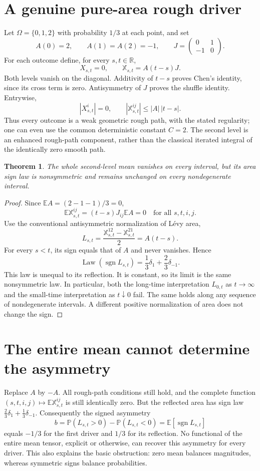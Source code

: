 \documentclass[11pt]{article}
\newtheorem{theorem}{Theorem}
\newcommand{\E}{\mathbb E}
\newcommand{\Prob}{\mathbb P}
\begin{document}
\section*{A genuine pure-area rough driver}
Let $\Omega=\{0,1,2\}$ with probability $1/3$ at each point, and set
\[
A(0)=2,\qquad A(1)=A(2)=-1,
\qquad J=\begin{pmatrix}0&1\\-1&0\end{pmatrix}.
\]
For each outcome define, for every $s,t\in\mathbb R$,
\[
X_{s,t}=0,\qquad \mathbb X_{s,t}=A(t-s)J.
\]
Both levels vanish on the diagonal. Additivity of $t-s$ proves Chen's
identity, since its cross term is zero. Antisymmetry of $J$ proves the shuffle
identity. Entrywise,
\[
|X_{s,t}^i|=0,\qquad
|\mathbb X_{s,t}^{ij}|\leq |A|\,|t-s|.
\]
Thus every outcome is a weak geometric rough path, with the stated regularity;
one can even use the common deterministic constant $C=2$.
The second level is an enhanced rough-path component, rather than the
classical iterated integral of the identically zero smooth path.

\begin{theorem}
The whole second-level mean vanishes on every interval, but its area sign
law is nonsymmetric and remains unchanged on every nondegenerate interval.
\end{theorem}
\begin{proof}
Since $\E A=(2-1-1)/3=0$,
\[
\E\mathbb X_{s,t}^{ij}=(t-s)J_{ij}\E A=0
\quad\text{for all }s,t,i,j.
\]
Use the conventional antisymmetric normalization of L\'evy area,
\[
L_{s,t}=\frac{\mathbb X_{s,t}^{12}-\mathbb X_{s,t}^{21}}2=A(t-s).
\]
For every $s<t$, its sign equals that of $A$ and never vanishes. Hence
\[
\operatorname{Law}(\operatorname{sgn}L_{s,t})
=\frac13\delta_1+\frac23\delta_{-1}.
\]
This law is unequal to its reflection. It is constant, so its limit is the
same nonsymmetric law. In particular, both the long-time interpretation
$L_{0,t}$ as $t\to\infty$ and the small-time interpretation as $t\downarrow0$
fail. The same holds along any sequence of nondegenerate intervals.
A different positive normalization of area does not change the sign.
\end{proof}

\section*{The entire mean cannot determine the asymmetry}
Replace $A$ by $-A$. All rough-path conditions still hold, and the complete
function $(s,t,i,j)\mapsto\E\mathbb X_{s,t}^{ij}$ is still identically zero.
But the reflected area has sign law
$\frac23\delta_1+\frac13\delta_{-1}$.
Consequently the signed asymmetry
\[
b=\Prob(L_{s,t}>0)-\Prob(L_{s,t}<0)
=\E[\operatorname{sgn}L_{s,t}]
\]
equals $-1/3$ for the first driver and $1/3$ for its reflection.
No functional of the entire mean tensor, explicit or otherwise, can recover
this asymmetry for every driver. This also explains the basic obstruction:
zero mean balances magnitudes, whereas symmetric signs balance probabilities.
\end{document}
